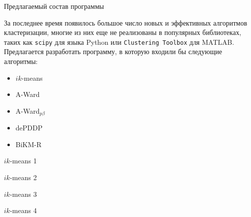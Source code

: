 \documentclass[aspectratio=169]{beamer}
\newcommand{\AWard}{\mbox{A-Ward}\xspace}
\newcommand{\AWardpb}{\mbox{A-Ward$ _{p\beta} $}\xspace}
\newcommand{\BiKMR}{\mbox{BiKM-R}\xspace}
\newcommand{\dePDDP}{dePDDP\xspace}
\newcommand{\ikmeans}{\mbox{$ ik $-means}\xspace}
\begin{document}
	\begin{frame}{Предлагаемый состав программы}

		\parbox{\linewidth}{За последнее время появилось большое число новых и эффективных алгоритмов кластеризации, многие из них еще не реализованы в популярных библиотеках, таких как \texttt{scipy} для языка Python или  \texttt{Clustering Toolbox} для MATLAB. Предлагается разработать программу, в которую входили бы следующие алгоритмы:}
		
       	\begin{itemize}
       		\item \ikmeans
       		\item \AWard
       		\item \AWardpb
       		\item \dePDDP
	       	\item \BiKMR
       	\end{itemize}
	
	\end{frame}

	
	\begin{frame}{\ikmeans 1}
			\begin{figure} %
				\centering
				
			\end{figure}
	\end{frame}
	
	\begin{frame}{\ikmeans 2}
		\begin{figure} %
			\centering
			
		\end{figure}
	\end{frame}
	
	\begin{frame}{\ikmeans 3}
		\begin{figure} %
			\centering
			
		\end{figure}
	\end{frame}
		
	\begin{frame}{\ikmeans 4}
		\begin{figure} %
			\centering
			
		\end{figure}
	\end{frame}	
	
\end{document}
